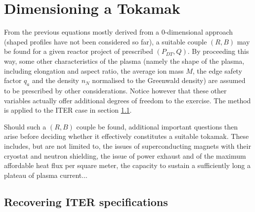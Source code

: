 \section{Dimensioning a Tokamak}
From the previous equations mostly derived from a 0-dimensional approach (shaped profiles have not been considered so far), a suitable couple $(R, B)$ may be found for a given reactor project of prescribed $(P_{DT}, Q)$. By proceeding this way, some other characteristics of the plasma (namely the shape of the plasma, including elongation and aspect ratio, the average ion mass $\hat M$, the edge safety factor $q_a$ and the density $n_N$ normalised to the Greenwald density) are assumed to be prescribed by other considerations. Notice however that these other variables actually offer additional degrees of freedom to the exercise. The method is applied to the ITER case in section \ref{sec:ITER_spec}.

Should such a $(R, B)$ couple be found, additional important questions then arise before deciding whether it effectively constitutes a suitable tokamak. These includes, but are not limited to, the issues of superconducting magnets with their cryostat and neutron shielding, the issue of power exhaust and of the maximum affordable heat flux per square meter, the capacity to sustain a sufficiently long a plateau of plasma current...\\

\subsection{Recovering ITER specifications}
\label{sec:ITER_spec}


